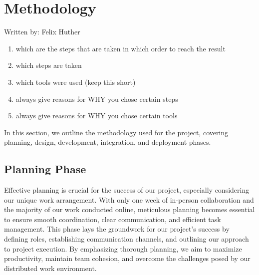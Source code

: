 \section{Methodology}
{\tiny Written by: Felix Huther}\\

\begin{enumerate}
    \item which are the steps that are taken 
    in which order to reach the result
    \item which steps are taken
    \item which tools were used (keep this short)
    \item always give reasons for WHY you chose 
    certain steps
    \item always give reasons for WHY you 
    chose certain tools
\end{enumerate}

In this section, we outline the methodology used for the project, covering planning, design, development, integration, and deployment phases.

\subsection{Planning Phase}

Effective planning is crucial for the success of our project, especially considering our unique work arrangement. With only one week of in-person collaboration and the majority of our work conducted online, meticulous planning becomes essential to ensure smooth coordination, clear communication, and efficient task management. This phase lays the groundwork for our project's success by defining roles, establishing communication channels, and outlining our approach to project execution. By emphasizing thorough planning, we aim to maximize productivity, maintain team cohesion, and overcome the challenges posed by our distributed work environment.

